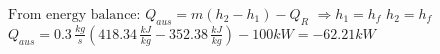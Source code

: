\( \text{From energy balance: } Q_{aus} = m (h_2 - h_1) - Q_R \)  
\( \Rightarrow h_1 = h_f \)  
\( h_2 = h_f \)  
\( Q_{aus} = 0.3 \, \frac{kg}{s} (418.34 \, \frac{kJ}{kg} - 352.38 \, \frac{kJ}{kg}) - 100kW = -62.21kW \)